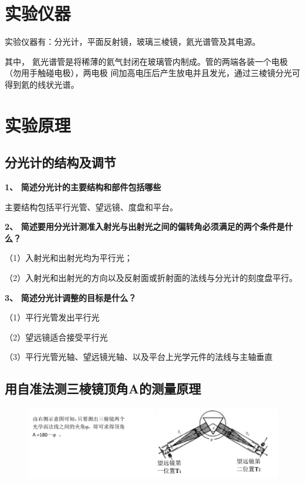 \documentclass[UTF8]{ctexart}
\begin{document}
\section{实验仪器}

\noindent 实验仪器有：分光计，平面反射镜，玻璃三棱镜，氦光谱管及其电源。

\noindent 其中， 氦光谱管是将稀薄的氦气封闭在玻璃管内制成。管的两端各装一个电极（勿用手触碰电极），两电极
间加高电压后产生放电并且发光，通过三棱镜分光可得到氦的线状光谱。

\section{实验原理}
\subsection{分光计的结构及调节}

\noindent  \textbf{1、 简述分光计的主要结构和部件包括哪些}

主要结构包括平行光管、望远镜、度盘和平台。


\noindent  \textbf{2、 简述要用分光计测准入射光与出射光之间的偏转角必须满足的两个条件是什么？}

（1）入射光和出射光均为平行光；

（2）入射光和出射光的方向以及反射面或折射面的法线与分光计的刻度盘平行。

\noindent  \textbf{3、 简述分光计调整的目标是什么？}

（1）平行光管发出平行光

（2）望远镜适合接受平行光

（3）平行光管光轴、望远镜光轴、以及平台上光学元件的法线与主轴垂直



\subsection{用自准法测三棱镜顶角A的测量原理}

    \begin{figure}[H]
        \centering
        \includegraphics[scale=0.55]{自准法原理.png}
    \end{figure}
\end{document}
